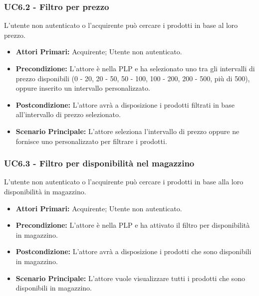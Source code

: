 \subsubsection{UC6.2 - Filtro per prezzo} \label{UC6.2}
L'utente non autenticato o l'acquirente può cercare i prodotti in base al loro prezzo.
\begin{itemize}
    \item \textbf{Attori Primari:} Acquirente; Utente non autenticato.
    \item \textbf{Precondizione:} L'attore è nella PLP e ha selezionato uno tra gli intervalli di prezzo disponibili (0 - 20, 20 - 50, 50 - 100, 100 - 200, 200 - 500, più di 500), oppure inserito un intervallo personalizzato.
    \item \textbf{Postcondizione:} L'attore avrà a disposizione i prodotti filtrati in base all'intervallo di prezzo selezionato.
    \item \textbf{Scenario Principale:} L'attore seleziona l'intervallo di prezzo oppure ne fornisce uno personalizzato per filtrare i prodotti.
\end{itemize}

\subsubsection{UC6.3 - Filtro per disponibilità nel magazzino} \label{UC6.3}
L'utente non autenticato o l'acquirente può cercare i prodotti in base alla loro disponibilità in magazzino.
\begin{itemize}
    \item \textbf{Attori Primari:} Acquirente; Utente non autenticato.
    \item \textbf{Precondizione:} L'attore è nella PLP e ha attivato il filtro per disponibilità in magazzino.
    \item \textbf{Postcondizione:} L'attore avrà a disposizione i prodotti che sono disponibili in magazzino.
    \item \textbf{Scenario Principale:} L'attore vuole visualizzare tutti i prodotti che sono disponibili in magazzino.
\end{itemize}
